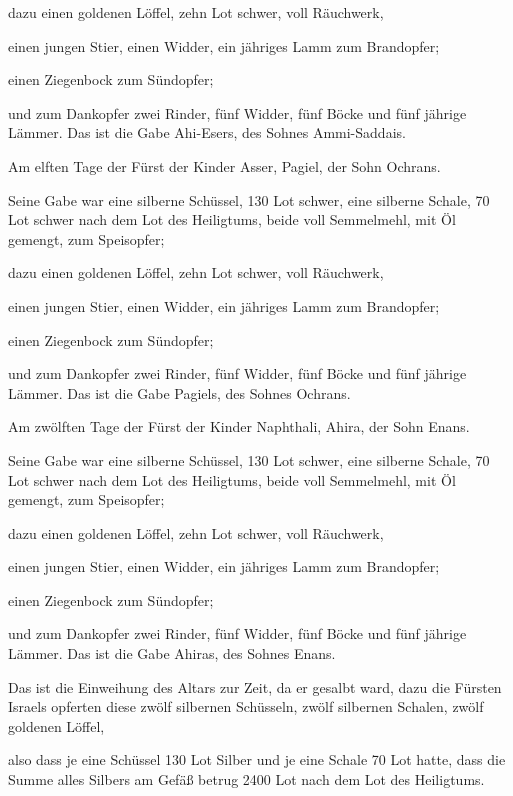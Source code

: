  dazu einen goldenen Löffel, zehn Lot schwer, voll
Räuchwerk,

 einen jungen Stier, einen Widder, ein jähriges Lamm zum
Brandopfer;

 einen Ziegenbock zum Sündopfer;

 und zum Dankopfer zwei Rinder, fünf Widder, fünf Böcke
und fünf jährige Lämmer. Das ist die Gabe Ahi-Esers, des Sohnes
Ammi-Saddais.

 Am elften Tage der Fürst der Kinder Asser, Pagiel, der
Sohn Ochrans.

 Seine Gabe war eine silberne Schüssel, 130 Lot schwer,
eine silberne Schale, 70 Lot schwer nach dem Lot des Heiligtums, beide
voll Semmelmehl, mit Öl gemengt, zum Speisopfer;

 dazu einen goldenen Löffel, zehn Lot schwer, voll
Räuchwerk,

 einen jungen Stier, einen Widder, ein jähriges Lamm zum
Brandopfer;

 einen Ziegenbock zum Sündopfer;

 und zum Dankopfer zwei Rinder, fünf Widder, fünf Böcke
und fünf jährige Lämmer. Das ist die Gabe Pagiels, des Sohnes Ochrans.

 Am zwölften Tage der Fürst der Kinder Naphthali, Ahira,
der Sohn Enans.

 Seine Gabe war eine silberne Schüssel, 130 Lot schwer,
eine silberne Schale, 70 Lot schwer nach dem Lot des Heiligtums, beide
voll Semmelmehl, mit Öl gemengt, zum Speisopfer;

 dazu einen goldenen Löffel, zehn Lot schwer, voll
Räuchwerk,

 einen jungen Stier, einen Widder, ein jähriges Lamm zum
Brandopfer;

 einen Ziegenbock zum Sündopfer;

 und zum Dankopfer zwei Rinder, fünf Widder, fünf Böcke
und fünf jährige Lämmer. Das ist die Gabe Ahiras, des Sohnes Enans.

 Das ist die Einweihung des Altars zur Zeit, da er
gesalbt ward, dazu die Fürsten Israels opferten diese zwölf silbernen
Schüsseln, zwölf silbernen Schalen, zwölf goldenen Löffel,

 also dass je eine Schüssel 130 Lot Silber und je eine
Schale 70 Lot hatte, dass die Summe alles Silbers am Gefäß betrug 2400
Lot nach dem Lot des Heiligtums.

